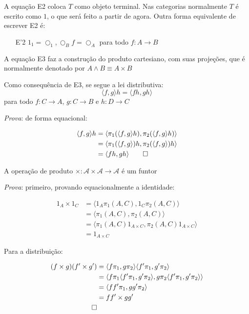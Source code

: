 \documentclass[../main.tex]{subfiles}
\begin{document}
A equação E2 coloca $T$ como objeto terminal. Nas categorias normalmente $T$ é escrito como $1$, o que será feito a partir de agora. Outra forma equivalente de escrever E2 é:

\begin{enumerate}
    \item[E'2] $1_1 = \bigcirc_1, \bigcirc_B f = \bigcirc_A$ para todo $f : A \to B$
\end{enumerate}

A equação E3 faz a construção do produto cartesiano, com suas projeções, que é normalmente denotado por $A \land B \equiv A \times B$

\begin{proposition}
    Como consequência de E3, se segue a lei distributiva:
    $$\langle f, g \rangle h = \langle fh, gh \rangle$$
    para todo $f : C \to A$, $g : C \to B$ e $h : D \to C$
\end{proposition}

\emph{Prova}: de forma equacional:

\begin{align*}
    \langle f, g \rangle h & = \langle \pi_1(\langle f, g \rangle h), \pi_2(\langle f, g \rangle h) \rangle \\
    & = \langle \pi_1(\langle f, g \rangle) h, \pi_2(\langle f, g \rangle) h \rangle \\
    & = \langle f h, g h \rangle \qed \\
\end{align*}

\begin{proposition}
    A operação de produto $\times : \mathcal{A} \times \mathcal{A} \to \mathcal{A}$ é um funtor
\end{proposition}

\emph{Prova}: primeiro, provando equacionalmente a identidade:

\begin{align*}
    1_A \times 1_C & = \langle 1_A \pi_1(A, C), 1_C \pi_2(A, C) \rangle \\
    & = \langle \pi_1(A, C), \pi_2(A, C) \rangle \\
    & = \langle \pi_1(A, C) 1_{A \times C}, \pi_2(A, C) 1_{A \times C} \rangle \\
    & = 1_{A \times C}
\end{align*}

Para a distribuição:

\begin{align*}
    (f \times g)(f' \times g') & = \langle f \pi_1, g \pi_2 \rangle \langle f' \pi_1, g' \pi_2 \rangle \\
    & = \langle f \pi_1  \langle f' \pi_1, g' \pi_2 \rangle, g \pi_2  \langle f' \pi_1, g' \pi_2 \rangle \rangle \\
    & = \langle f f' \pi_1, g g' \pi_2 \rangle \\
    & = f f' \times g g' \\ \qed
\end{align*}
\end{document}
